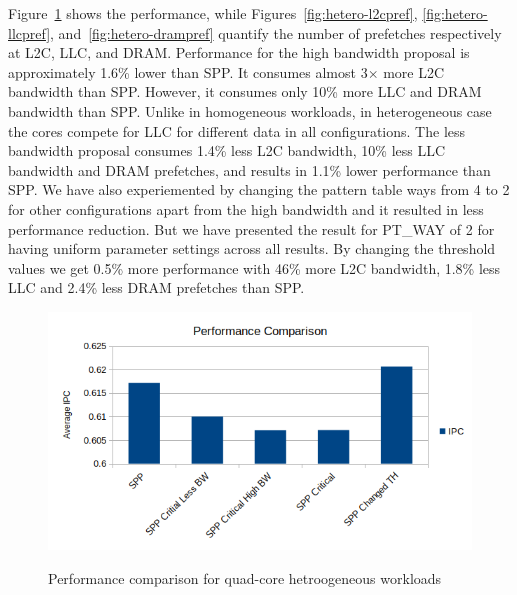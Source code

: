 Figure~\ref{fig:hetero-perf} shows the performance, while Figures~\ref{fig:hetero-l2cpref}, \ref{fig:hetero-llcpref}, and~\ref{fig:hetero-drampref} quantify the number of prefetches respectively at L2C, LLC, and DRAM.
Performance for the high bandwidth proposal is approximately 1.6\% lower than SPP. It consumes almost 3$\times$ more L2C bandwidth than SPP. However, it consumes only 10\% more LLC and DRAM bandwidth than SPP. Unlike in homogeneous workloads, in heterogeneous case the cores compete for LLC for different data in all configurations. The
less bandwidth proposal consumes 1.4\% less L2C bandwidth, 10\% less LLC bandwidth and DRAM prefetches, and results in 1.1\% lower performance than SPP.
We have also experiemented by changing the pattern table ways from 4 to 2 for other configurations apart from the high bandwidth and it resulted in less performance reduction.
But we have presented the result for PT\_WAY of 2 for having uniform parameter settings across all results.
By changing the threshold values we get 0.5\% more performance with 46\% more L2C bandwidth, 1.8\%  less LLC and 2.4\% less DRAM prefetches than SPP.
\begin{figure}[H]
{\includegraphics[scale=0.7]{images/IPC_Hetro.png}}
\caption{Performance comparison for quad-core hetroogeneous workloads}
\label{fig:hetero-perf}
\end{figure}

